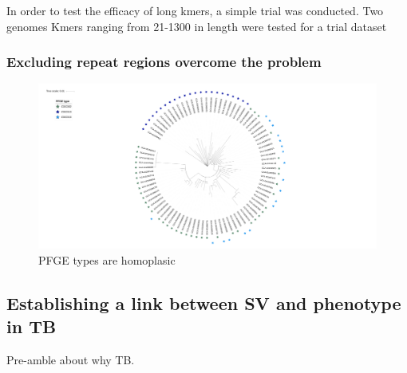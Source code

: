 \documentclass{article}
\begin{document}

In order to test the efficacy of long kmers, a simple trial was conducted. Two genomes 
Kmers ranging from 21-1300 in length were tested for a trial dataset


\subsubsection{Excluding repeat regions overcome the problem}






\begin{figure}[h!]
\centering

\includegraphics[width=\textwidth{}]{PFGE_tree.png}
\caption{PFGE types are homoplasic}
\label{fig:PFGE_tree}
\end{figure}



\subsection{Establishing a link between SV and phenotype in TB}
Pre-amble about why TB.
\subsubsection{}


%
%
\end{document}
